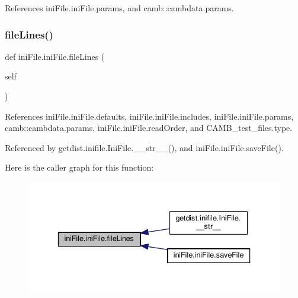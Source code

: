 References ini\+File.\+ini\+File.\+params, and camb\+::cambdata.\+params.

\mbox{\label{classiniFile_1_1iniFile_a61460ca894d71e86784b1a79b244bf11}} 
\subsubsection{\texorpdfstring{file\+Lines()}{fileLines()}}
{\footnotesize\ttfamily def ini\+File.\+ini\+File.\+file\+Lines (\begin{DoxyParamCaption}\item[{}]{self }\end{DoxyParamCaption})}



References ini\+File.\+ini\+File.\+defaults, ini\+File.\+ini\+File.\+includes, ini\+File.\+ini\+File.\+params, camb\+::cambdata.\+params, ini\+File.\+ini\+File.\+read\+Order, and C\+A\+M\+B\+\_\+test\+\_\+files.\+type.



Referenced by getdist.\+inifile.\+Ini\+File.\+\_\+\+\_\+str\+\_\+\+\_\+(), and ini\+File.\+ini\+File.\+save\+File().

Here is the caller graph for this function\+:
\nopagebreak
\begin{figure}[H]
\begin{center}
\leavevmode
\includegraphics[width=336pt]{classiniFile_1_1iniFile_a61460ca894d71e86784b1a79b244bf11_icgraph}
\end{center}
\end{figure}
\mbox{\label{classiniFile_1_1iniFile_ab471d92ca6e30f4df3b98f982a5656c6}} 
